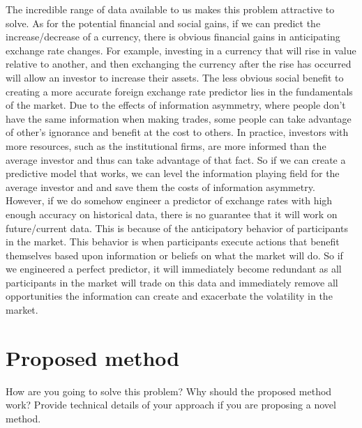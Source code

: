 \documentclass[twoside]{article}
\begin{document}
The incredible range of data available to us makes this problem attractive to solve. 
As for the potential financial and social gains, if we can predict the increase/decrease of a currency, there is obvious financial gains in anticipating exchange rate changes. For example, investing in a currency that will rise in value relative to another, and then exchanging the currency after the rise has occurred will allow an investor to increase their assets. The less obvious social benefit to creating a more accurate foreign exchange rate predictor lies in the fundamentals of the market. Due to the effects of information asymmetry, where people don’t have the same information when making trades, some people can take advantage of other’s ignorance and benefit at the cost to others. In practice, investors with more resources, such as the institutional firms, are more informed than the average investor and thus can take advantage of that fact. So if we can create a predictive model that works, we can level the information playing field for the average investor and and save them the costs of information asymmetry. 
However, if we do somehow engineer a predictor of exchange rates with high enough accuracy on historical data, there is no guarantee that it will work on future/current data. This is because of the anticipatory behavior of participants in the market. This behavior is when participants execute actions that benefit themselves based upon information or beliefs on what the market will do. So if we engineered a perfect predictor, it will immediately become redundant as all participants in the market will trade on this data and immediately remove all opportunities the information can create and exacerbate the volatility in the market. 


\section{Proposed method}

How are you going to solve this problem? Why should the proposed method work? Provide technical details of your approach if you are proposing a novel method.\\
\end{document}
